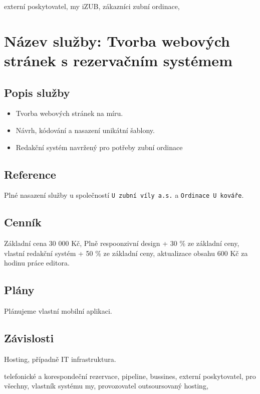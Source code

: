 \documentclass[12pt, a4paper, titlepage]{article}
\begin{document}
	externí poskytovatel,
	my iZUB, zákazníci zubní ordinace,



	\newpage
	\noindent\makebox[\linewidth]{\rule{16cm}{0.4pt}}


	\section*{Název služby: Tvorba webových stránek s rezervačním systémem}

	\vspace{1em}

	\subsection*{Popis služby}
	\begin{itemize}
		\item Tvorba webových stránek na míru.
		\item Návrh, kódování a nasazení unikátní šablony.
		\item Redakční systém navržený pro potřeby zubní ordinace
	\end{itemize}

	\subsection*{Reference}
	Plné nasazení služby u společností \texttt{U zubní víly a.s.} a \texttt{Ordinace U kováře}.

	\subsection*{Cenník}
	Základní cena 30 000 Kč, Plně respoonzivní design + 30 \% ze základní ceny, vlastní redakční systém + 50 \% ze základní ceny, aktualizace obsahu 600 Kč za hodinu práce editora.

	\subsection*{Plány}
	Plánujeme vlastní mobilní aplikaci.

	\subsection*{Závislosti}
	Hosting, případně IT infrastruktura.

	telefonické a korespondeční rezervace, pipeline, bussines, externí poskytovatel, pro všechny,
	vlastník systému my, provozovatel outsoursovaný hosting, 
\end{document}
